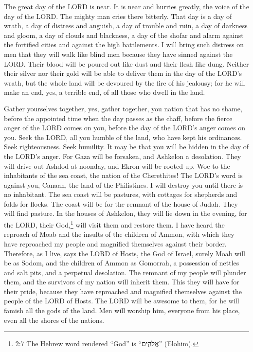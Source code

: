 \myverse{}The great day of the LORD is near. It is near and hurries greatly, the voice of the day of the LORD. The mighty man cries there bitterly. \myverse{}That day is a day of wrath, a day of distress and anguish, a day of trouble and ruin, a day of darkness and gloom, a day of clouds and blackness, \myverse{}a day of the shofar and alarm against the fortified cities and against the high battlements. \myverse{}I will bring such distress on men that they will walk like blind men because they have sinned against the LORD. Their blood will be poured out like dust and their flesh like dung. \myverse{}Neither their silver nor their gold will be able to deliver them in the day of the LORD’s wrath, but the whole land will be devoured by the fire of his jealousy; for he will make an end, yes, a terrible end, of all those who dwell in the land.


\mychapter{} \myverse*{}Gather yourselves together, yes, gather together, you nation that has no shame, \myverse{}before the appointed time when the day passes as the chaff, before the fierce anger of the LORD comes on you, before the day of the LORD’s anger comes on you. \myverse{}Seek the LORD, all you humble of the land, who have kept his ordinances. Seek righteousness. Seek humility. It may be that you will be hidden in the day of the LORD’s anger. \myverse{}For Gaza will be forsaken, and Ashkelon a desolation. They will drive out Ashdod at noonday, and Ekron will be rooted up. \myverse{}Woe to the inhabitants of the sea coast, the nation of the Cherethites! The LORD’s word is against you, Canaan, the land of the Philistines. I will destroy you until there is no inhabitant. \myverse{}The sea coast will be pastures, with cottages for shepherds and folds for flocks. \myverse{}The coast will be for the remnant of the house of Judah. They will find pasture. In the houses of Ashkelon, they will lie down in the evening, for the LORD, their God,\footnote{2:7 The Hebrew word rendered “God” is “אֱלֹהִ֑ים” (Elohim).} will visit them and restore them. \myverse{}I have heard the reproach of Moab and the insults of the children of Ammon, with which they have reproached my people and magnified themselves against their border. \myverse{}Therefore, as I live, says the LORD of Hosts, the God of Israel, surely Moab will be as Sodom, and the children of Ammon as Gomorrah, a possession of nettles and salt pits, and a perpetual desolation. The remnant of my people will plunder them, and the survivors of my nation will inherit them. \myverse{}This they will have for their pride, because they have reproached and magnified themselves against the people of the LORD of Hosts. \myverse{}The LORD will be awesome to them, for he will famish all the gods of the land. Men will worship him, everyone from his place, even all the shores of the nations.


